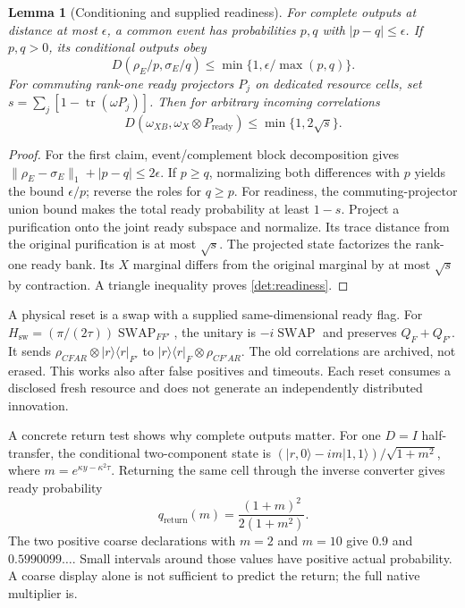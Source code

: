 \documentclass[11pt,oneside,openany]{book}
\newtheorem{lemma}[theorem]{Lemma}
\theoremstyle{definition}
\theoremstyle{remark}\newtheorem{remark}[theorem]{Remark}
\begin{document}
\begin{lemma}[Conditioning and supplied readiness]\label{det:ready-rare}
For complete outputs at distance at most $\epsilon$, a common event
has probabilities $p,q$ with $|p-q|\le\epsilon$. If $p,q>0$, its
conditional outputs obey
\begin{equation}
 D(\rho_E/p,\sigma_E/q)
      \le\min\{1,\epsilon/\max(p,q)\}.          \label{det:rare}
\end{equation}
For commuting rank-one ready projectors $P_j$ on dedicated resource
cells, set $s=\sum_j[1-\operatorname{tr}(\omega P_j)]$. Then for
arbitrary incoming correlations
\begin{equation}
 D(\omega_{XB},\omega_X\otimes P_{\mathrm{ready}})
                \le\min\{1,2\sqrt s\}.         \label{det:readiness}
\end{equation}
\end{lemma}
\begin{proof}
For the first claim, event/complement block decomposition gives
$\|\rho_E-\sigma_E\|_1+|p-q|\le2\epsilon$.
If $p\ge q$, normalizing both differences with $p$ yields the bound
$\epsilon/p$; reverse the roles for $q\ge p$.
For readiness, the commuting-projector union bound makes the total
ready probability at least $1-s$. Project a purification onto the
joint ready subspace and normalize. Its trace distance from the
original purification is at most $\sqrt s$. The projected state
factorizes the rank-one ready bank. Its $X$ marginal differs from the
original marginal by at most $\sqrt s$ by contraction. A triangle
inequality proves \eqref{det:readiness}.
\end{proof}

A physical reset is a swap with a supplied same-dimensional ready flag.
For $H_{\mathrm{sw}}=(\pi/(2\tau))\operatorname{SWAP}_{FF'}$,
the unitary is $-i\operatorname{SWAP}$ and preserves $Q_F+Q_{F'}$.
It sends
$\rho_{CFAR}\otimes|r\rangle\langle r|_{F'}$
to $|r\rangle\langle r|_F\otimes\rho_{CF'AR}$.
The old correlations are archived, not erased. This works also after
false positives and timeouts. Each reset consumes a disclosed fresh
resource and does not generate an independently distributed innovation.

A concrete return test shows why complete outputs matter. For one
$D=I$ half-transfer, the conditional two-component state is
$(|r,0\rangle-im|1,1\rangle)/\sqrt{1+m^2}$, where
$m=e^{\kappa y-\kappa^2\tau}$. Returning the same cell through the
inverse converter gives ready probability
\[
 q_{\mathrm{return}}(m)=\frac{(1+m)^2}{2(1+m^2)}.
\]
The two positive coarse declarations with $m=2$ and $m=10$ give
$0.9$ and $0.5990099\ldots$. Small intervals around those values have
positive actual probability. A coarse display alone is not sufficient
to predict the return; the full native multiplier is.
\end{document}
